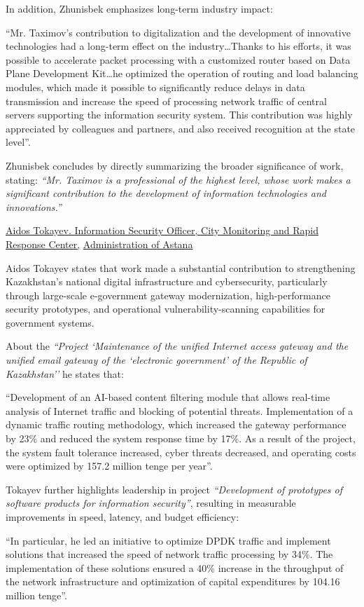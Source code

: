 In addition, Zhunisbek emphasizes long-term industry impact:
\begin{fullquote}
``Mr. Taximov’s contribution to digitalization and the development of innovative technologies had a long-term effect on the industry\dots Thanks to his efforts, it was possible to accelerate packet processing with a customized router based on Data Plane Development Kit\dots he optimized the operation of routing and load balancing modules, which made it possible to significantly reduce delays in data transmission and increase the speed of processing network traffic of central servers supporting the information security system. This contribution was highly appreciated by colleagues and partners, and also received recognition at the state level''.
\end{fullquote}

Zhunisbek concludes by directly summarizing the broader significance of \mrls work, stating:
\emph{``Mr. Taximov is a professional of the highest level, whose work makes a significant contribution to the development of information technologies and innovations.''} 

\bigskip
\noindent\underline{Aidos Tokayev. Information Security Officer, City Monitoring and Rapid Response Center,}
\noindent\underline{Administration of Astana}

Aidos Tokayev states that \mrls work made a substantial contribution to strengthening Kazakhstan’s national digital infrastructure and cybersecurity, particularly through large-scale e-government gateway modernization, high-performance security prototypes, and operational vulnerability-scanning capabilities for government systems.

About the \emph{``Project `Maintenance of the unified Internet access gateway and the unified email gateway of the `electronic government' of the Republic of Kazakhstan''} he states that:
\begin{fullquote}
``Development of an AI-based content filtering module that allows real-time analysis of Internet traffic and blocking of potential threats. Implementation of a dynamic traffic routing methodology, which increased the gateway performance by 23\% and reduced the system response time by 17\%. As a result of the project, the system fault tolerance increased, cyber threats decreased, and operating costs were optimized by 157.2 million tenge per year''.
\end{fullquote}

Tokayev further highlights \mrls leadership in project \emph{``Development of prototypes of software products for information security''}, resulting in measurable improvements in speed, latency, and budget efficiency:
\begin{fullquote}
``In particular, he led an initiative to optimize DPDK traffic and implement solutions that increased the speed of network traffic processing by 34\%. The implementation of these solutions ensured a 40\% increase in the throughput of the network infrastructure and optimization of capital expenditures by 104.16 million tenge''.
\end{fullquote}

